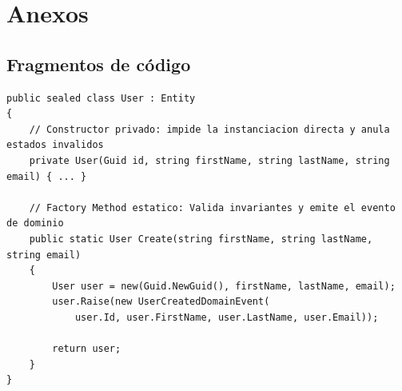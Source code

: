 \chapter{Anexos}
\label{chap:anexos}

\section{Fragmentos de código}

\begin{lstlisting}[float=htbp, style=CSharp, caption={Implementación del patrón Static Factory Method en la entidad User.}, label={lst:factory_user}]
public sealed class User : Entity
{
    // Constructor privado: impide la instanciacion directa y anula estados invalidos
    private User(Guid id, string firstName, string lastName, string email) { ... }

    // Factory Method estatico: Valida invariantes y emite el evento de dominio
    public static User Create(string firstName, string lastName, string email)
    {
        User user = new(Guid.NewGuid(), firstName, lastName, email);
        user.Raise(new UserCreatedDomainEvent(
            user.Id, user.FirstName, user.LastName, user.Email));

        return user;
    }
}
\end{lstlisting}

